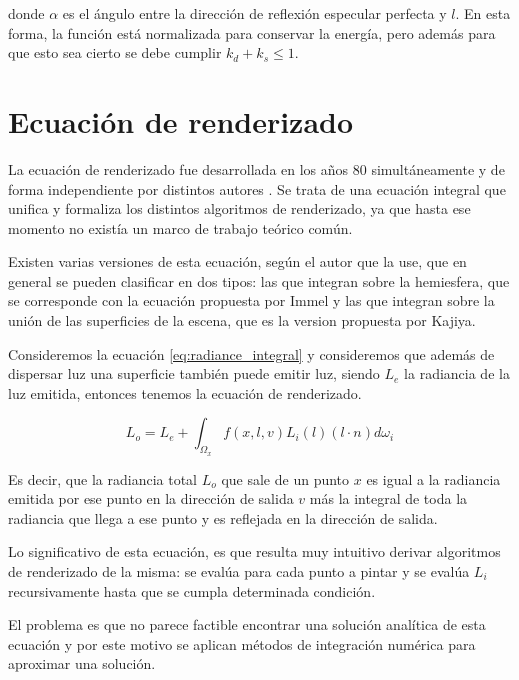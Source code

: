donde $\alpha$ es el ángulo entre la dirección de reflexión especular perfecta y $l$.
En esta forma, la función está normalizada para conservar la energía, pero además para que esto sea cierto se debe cumplir $k_d + k_s \leq 1$.



\clearpage

\section{Ecuación de renderizado}

La ecuación de renderizado fue desarrollada en los años 80 simultáneamente y de forma independiente por distintos autores \cite{Kajiya1986, Immel1986}. Se trata de una ecuación integral que unifica y formaliza los distintos algoritmos de renderizado, ya que hasta ese momento no existía un marco de trabajo teórico común.

\medskip
Existen varias versiones de esta ecuación, según el autor que la use, que en general se pueden clasificar en dos tipos: las que integran sobre la hemiesfera, que se corresponde con la ecuación propuesta por Immel y las que integran sobre la unión de las superficies de la escena, que es la version propuesta por Kajiya.
\medskip

Consideremos la ecuación \ref{eq:radiance_integral}  y consideremos que además de dispersar luz una superficie también puede emitir luz, siendo $L_e$ la radiancia de la luz emitida, entonces tenemos la ecuación de renderizado.

\begin{equation}
L _ o = L_e + \int_{\Omega_x} f(x, l, v) L_i(l) (l \cdot n) d\omega_i 
\end{equation}

Es decir, que la radiancia total $L_o$ que sale de un punto $x$ es igual a la radiancia emitida por ese punto en la dirección de salida $v$ más la integral de toda la radiancia que llega a ese punto y es reflejada en la dirección de salida.
\medskip

Lo significativo de esta ecuación, es que resulta muy intuitivo derivar algoritmos de renderizado de la misma: se evalúa para cada punto a pintar y se evalúa $L_i$ recursivamente hasta que se cumpla determinada condición.
\medskip

El problema es que no parece factible encontrar una solución analítica de esta ecuación y por este motivo se aplican métodos de integración numérica para aproximar una solución.

